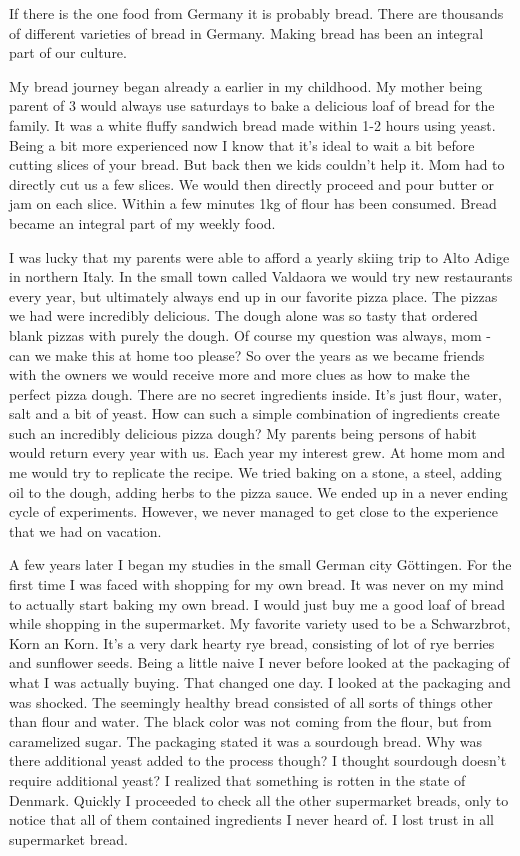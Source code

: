 If there is the one food from Germany it is probably bread. There are thousands
of different varieties of bread in Germany. Making bread has been an integral part
of our culture.

My bread journey began already a earlier in my childhood. My mother being parent
of 3 would always use saturdays to bake a delicious loaf of bread for the family.
It was a white fluffy sandwich bread made within 1-2 hours using yeast.
Being a bit more experienced now I know that it's
ideal to wait a bit before cutting slices of your bread. But back then
we kids couldn't help it. Mom had to directly cut us a few slices. We would then
directly proceed and pour butter or jam on each slice. Within a few minutes 1kg of
flour has been consumed. Bread became an integral part of my weekly food.

I was lucky that my parents were able to afford a yearly skiing trip to
Alto Adige in northern Italy. In the small town called Valdaora we
would try new restaurants every year, but ultimately always end up in our favorite
pizza place. The pizzas we had were incredibly delicious. The dough
alone was so tasty that ordered blank pizzas with purely the dough.
Of course my question was always, mom - can we make this at home too please?
So over the years as we became friends with the owners we would receive
more and more clues as how to make the perfect pizza dough. There
are no secret ingredients inside. It's just flour, water, salt and a bit of yeast.
How can such a simple combination of ingredients create such an incredibly delicious
pizza dough? My parents being persons of habit would return every year with us.
Each year my interest grew. At home mom and me would try to replicate
the recipe. We tried baking on a stone, a steel, adding oil to the dough,
adding herbs to the pizza sauce. We ended up in a never ending cycle
of experiments. However, we never managed to get close to the experience
that we had on vacation.

A few years later I began my studies in the small German city Göttingen.
For the first time I was faced with shopping for my own bread. It was never
on my mind to actually start baking my own bread. I would just buy me
a good loaf of bread while shopping in the supermarket. My favorite variety
used to be a Schwarzbrot, Korn an Korn. It's a very dark hearty rye bread,
consisting of lot of rye berries and sunflower seeds. Being a little naive
I never before looked at the packaging of what I was actually buying. That
changed one day. I looked at the packaging and was shocked. The seemingly
healthy bread consisted of all sorts of things other than flour and water.
The black color was not coming from the flour, but from caramelized sugar.
The packaging stated it was a sourdough bread. Why was there additional yeast
added to the process though? I thought sourdough doesn't require additional
yeast? I realized that something is rotten in the state of Denmark.
Quickly I proceeded to check all the other supermarket breads, only to
notice that all of them contained ingredients I never heard of. I lost trust
in all supermarket bread.

